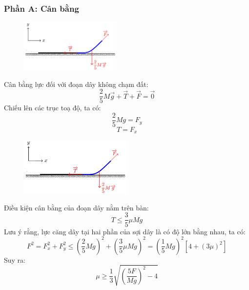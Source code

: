 \subsubsection*{Phần A: Cân bằng}
\begin{figure}[H]
  \centering
  \includegraphics[width=0.45\textwidth]{Figures/Solutions/Fig 3.1.png}
\end{figure}
\vspace{-0.5cm}

\noindent Cân bằng lực đối với đoạn dây không chạm đất:
\begin{equation*}
  \frac{2}{5} M \vec{g} + \vec{T} + \vec{F} = \vec{0}
\end{equation*}
Chiếu lên các trục toạ độ, ta có:
\begin{equation*}
  \frac{2}{5}Mg = F_y
\end{equation*}
\begin{equation*}
  T = F_x
\end{equation*}
\begin{figure}[H]
  \centering
  \includegraphics[width=0.5\textwidth]{Figures/Solutions/Fig 3.1.png}
\end{figure}
\vspace{-0.5cm}

\noindent Điều kiện cân bằng của đoạn dây nằm trên bàn:
\begin{equation*}
  T \leq \frac{3}{5} \mu M g
\end{equation*}
Lưu ý rằng, lực căng dây tại hai phần của sợi dây là có độ lớn bằng nhau, ta có:
\begin{equation*}
  F^2 = F_x^2 + F_y^2 \leq \left( \frac{2}{5}Mg \right)^2 + \left( \frac{3}{5} \mu Mg \right)^2 = \left( \frac{1}{5}Mg \right)^2 \left[ 4 + (3\mu)^2 \right]
\end{equation*}
Suy ra:
\begin{equation*}
  \mu \geq \frac{1}{3} \sqrt{ \left( \frac{5F}{Mg} \right)^2 - 4 }
\end{equation*}

